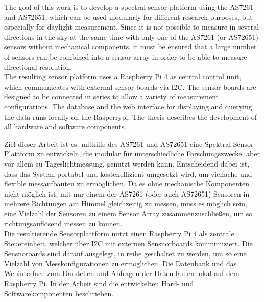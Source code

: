 The goal of this work is to develop a spectral sensor platform using the AS7261 and AS72651, which can be used modularly for different research purposes, but especially for daylight measurement. Since it is not possible to measure in several directions in the sky at the same time with only one of the AS7261 (or AS72651) sensors without mechanical components, it must be ensured that a large number of sensors can be combined into a sensor array in order to be able to measure directional resolution.\\
The resulting sensor platform uses a Raspberry Pi 4 as central control unit, which communicates with external sensor boards via I2C.
The sensor boards are designed to be connected in series to allow a variety of measurement configurations.
The database and the web interface for displaying and querying the data runs locally on the Rasperrypi.
The thesis describes the development of all hardware and software components.\bigskip

\noindent Ziel dieser Arbeit ist es, mithilfe des AS7261 und AS72651 eine Spektral-Sensor Plattform zu entwickeln, die modular für unterschiedliche Forschungszwecke, aber vor allem zu Tageslichtmessung, genutzt werden kann. Entscheidend dabei ist, dass das System portabel und kosteneffizient umgesetzt wird, um vielfache und flexible messaufbauten zu ermöglichen. Da es ohne mechanische Komponenten nicht möglich ist, mit nur einem der AS7261 (oder auch AS72651) Sensoren in mehrere Richtungen am Himmel gleichzeitig zu messen, muss es möglich sein, eine Vielzahl der Sensoren zu einem Sensor Array zusammenzuschließen, um so richtungsauflösend messen zu können. \\
Die resultierende Sensorplattform nutzt einen Raspberry Pi 4 als zentrale Steuereinheit, welcher über I2C mit externen Sensnorboards kommuniziert.
Die Sensnoroards sind darauf ausgelegt, in reihe geschaltet zu werden, um so eine Vielzahl von Messkonfigurationen zu ermöglichen. Die Datenbank und das Webinterface zum Darstellen und Abfragen der Daten laufen lokal auf dem Raspberry Pi. In der Arbeit sind die entwickelten Hard- und Softwarekomponenten beschrieben.
